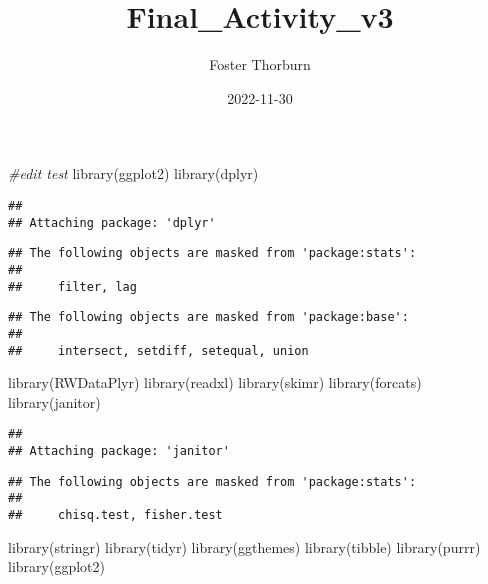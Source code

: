 \documentclass[
]{article}
\title{Final\_Activity\_v3}
\author{Foster Thorburn}
\date{2022-11-30}
\newenvironment{Shaded}{\begin{snugshade}}{\end{snugshade}}
\newcommand{\CommentTok}[1]{\textcolor[rgb]{0.56,0.35,0.01}{\textit{#1}}}
\newcommand{\FunctionTok}[1]{\textcolor[rgb]{0.00,0.00,0.00}{#1}}
\newcommand{\NormalTok}[1]{#1}
\begin{document}
\maketitle

\begin{Shaded}
\begin{Highlighting}[]
\CommentTok{\#edit test}
\FunctionTok{library}\NormalTok{(ggplot2)}
\FunctionTok{library}\NormalTok{(dplyr)}
\end{Highlighting}
\end{Shaded}

\begin{verbatim}
## 
## Attaching package: 'dplyr'
\end{verbatim}

\begin{verbatim}
## The following objects are masked from 'package:stats':
## 
##     filter, lag
\end{verbatim}

\begin{verbatim}
## The following objects are masked from 'package:base':
## 
##     intersect, setdiff, setequal, union
\end{verbatim}

\begin{Shaded}
\begin{Highlighting}[]
\FunctionTok{library}\NormalTok{(RWDataPlyr)}
\FunctionTok{library}\NormalTok{(readxl)}
\FunctionTok{library}\NormalTok{(skimr)}
\FunctionTok{library}\NormalTok{(forcats)}
\FunctionTok{library}\NormalTok{(janitor)}
\end{Highlighting}
\end{Shaded}

\begin{verbatim}
## 
## Attaching package: 'janitor'
\end{verbatim}

\begin{verbatim}
## The following objects are masked from 'package:stats':
## 
##     chisq.test, fisher.test
\end{verbatim}

\begin{Shaded}
\begin{Highlighting}[]
\FunctionTok{library}\NormalTok{(stringr)}
\FunctionTok{library}\NormalTok{(tidyr)}
\FunctionTok{library}\NormalTok{(ggthemes)}
\FunctionTok{library}\NormalTok{(tibble)}
\FunctionTok{library}\NormalTok{(purrr)}
\FunctionTok{library}\NormalTok{(ggplot2)}
\end{Highlighting}
\end{Shaded}
\end{document}
